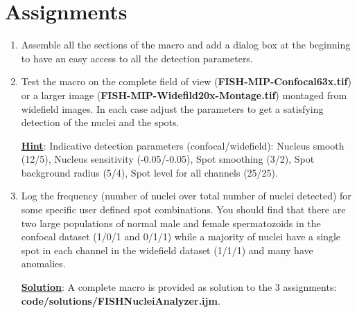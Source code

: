 \section{Assignments}

\begin{enumerate}
\item Assemble all the sections of the macro and add a dialog box at the beginning to have an easy access to all the detection parameters.
 
\item Test the macro on the complete field of view (\textbf{FISH-MIP-Confocal63x.tif}) or a larger image (\textbf{FISH-MIP-Widefild20x-Montage.tif}) montaged from widefield images. In each case adjust the parameters to get a satisfying detection of the nuclei and the spots.

\textbf{\underline{Hint}}: Indicative detection parameters (confocal/widefield): Nucleus smooth (12/5), Nucleus sensitivity (-0.05/-0.05), Spot smoothing (3/2), Spot background radius (5/4), Spot level for all channels (25/25).

\item Log the frequency (number of nuclei over total number of nuclei detected) for some specific user defined spot combinations. You should find that there are two large populations of normal male and female spermatozoids in the confocal dataset (1/0/1 and 0/1/1) while a majority of nuclei have a single spot in each channel in the widefield dataset (1/1/1) and many have anomalies.

\textbf{\underline{Solution}}: A complete macro is provided as solution to the 3 assignments: \textbf{code/solutions/FISHNucleiAnalyzer.ijm}.

\end{enumerate}
